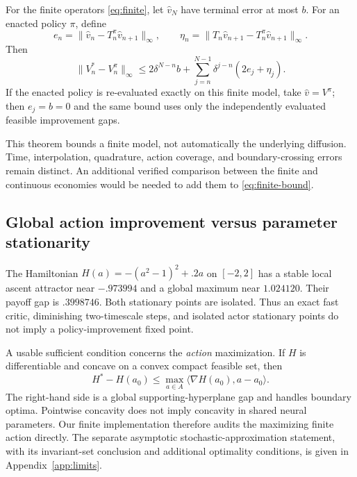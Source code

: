 \begin{theorem}\label{thm:finite}
For the finite operators \eqref{eq:finite}, let $\widehat v_N$ have terminal error at most $b$. For an enacted policy $\pi$, define
\[
e_n=\|\widehat v_n-T_n^\pi\widehat v_{n+1}\|_\infty,
\qquad \eta_n=\|T_n\widehat v_{n+1}-T_n^\pi\widehat v_{n+1}\|_\infty.
\]
Then
\begin{equation}
\|V_n^*-V_n^\pi\|_\infty
\leq 2\delta^{N-n}b+\sum_{j=n}^{N-1}\delta^{j-n}(2e_j+\eta_j).
\label{eq:finite-bound}
\end{equation}
If the enacted policy is re-evaluated exactly on this finite model, take $\widehat v=V^\pi$; then $e_j=b=0$ and the same bound uses only the independently evaluated feasible improvement gaps.
\end{theorem}
This theorem bounds a finite model, not automatically the underlying diffusion. Time, interpolation, quadrature, action coverage, and boundary-crossing errors remain distinct. An additional verified comparison between the finite and continuous economies would be needed to add them to \eqref{eq:finite-bound}.

\subsection{Global action improvement versus parameter stationarity}
The Hamiltonian $H(a)=-(a^2-1)^2+.2a$ on $[-2,2]$ has a stable local ascent attractor near $-.973994$ and a global maximum near $1.024120$. Their payoff gap is $.3998746$. Both stationary points are isolated. Thus an exact fast critic, diminishing two-timescale steps, and isolated actor stationary points do not imply a policy-improvement fixed point.

A usable sufficient condition concerns the \emph{action} maximization. If $H$ is differentiable and concave on a convex compact feasible set, then
\begin{equation}
H^*-H(a_0)\leq\max_{a\in A}\langle\nabla H(a_0),a-a_0\rangle.
\label{eq:fwgap}
\end{equation}
The right-hand side is a global supporting-hyperplane gap and handles boundary optima. Pointwise concavity does not imply concavity in shared neural parameters. Our finite implementation therefore audits the maximizing finite action directly. The separate asymptotic stochastic-approximation statement, with its invariant-set conclusion and additional optimality conditions, is given in Appendix~\ref{app:limits}.

